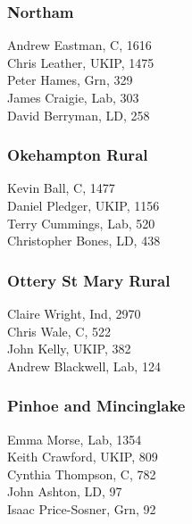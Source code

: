\documentclass[a4paper,openany,10pt]{book}
\begin{document}
\subsubsection*{Northam}



Andrew Eastman, C, 1616\\
Chris Leather, UKIP, 1475\\
Peter Hames, Grn, 329\\
James Craigie, Lab, 303\\
David Berryman, LD, 258\\


\subsubsection*{Okehampton Rural}



Kevin Ball, C, 1477\\
Daniel Pledger, UKIP, 1156\\
Terry Cummings, Lab, 520\\
Christopher Bones, LD, 438\\


\subsubsection*{Ottery St Mary Rural}



Claire Wright, Ind, 2970\\
Chris Wale, C, 522\\
John Kelly, UKIP, 382\\
Andrew Blackwell, Lab, 124\\


\subsubsection*{Pinhoe and Mincinglake}



Emma Morse, Lab, 1354\\
Keith Crawford, UKIP, 809\\
Cynthia Thompson, C, 782\\
John Ashton, LD, 97\\
Isaac Price-Sosner, Grn, 92\\
\end{document}
